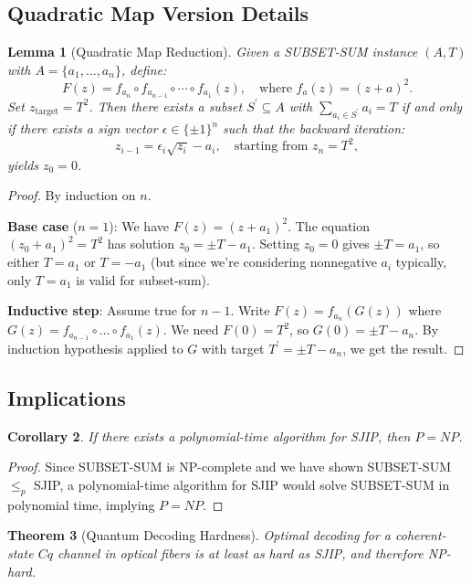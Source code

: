 \documentclass[12pt]{article}
\newtheorem{theorem}{Theorem}[section]
\newtheorem{lemma}[theorem]{Lemma}
\newtheorem{corollary}[theorem]{Corollary}
\begin{document}
\subsection{Quadratic Map Version Details}
\begin{lemma}[Quadratic Map Reduction]
Given a SUBSET-SUM instance $(A,T)$ with $A = \{a_{1},\ldots ,a_{n}\}$, define:
\[
F(z) = f_{a_{n}}\circ f_{a_{n - 1}}\circ \cdots \circ f_{a_{1}}(z),\quad \text{where } f_{a}(z) = (z + a)^{2}.
\]
Set $z_{\mathrm{target}} = T^{2}$. Then there exists a subset $S^{\prime}\subseteq A$ with $\sum_{a_{i}\in S^{\prime}}a_{i} = T$ if and only if there exists a sign vector $\epsilon \in \{\pm 1\}^{n}$ such that the backward iteration:
\[
z_{i - 1} = \epsilon_{i}\sqrt{z_{i}} -a_{i},\quad \text{starting from } z_{n} = T^{2},
\]
yields $z_{0} = 0$.
\end{lemma}

\begin{proof}
By induction on $n$.

\textbf{Base case} ($n = 1$): We have $F(z) = (z + a_{1})^{2}$. The equation $(z_{0} + a_{1})^{2} = T^{2}$ has solution $z_{0} = \pm T - a_{1}$. Setting $z_{0} = 0$ gives $\pm T = a_{1}$, so either $T = a_{1}$ or $T = -a_{1}$ (but since we're considering nonnegative $a_{i}$ typically, only $T = a_{1}$ is valid for subset-sum).

\textbf{Inductive step}: Assume true for $n - 1$. Write $F(z) = f_{a_{n}}(G(z))$ where $G(z) = f_{a_{n - 1}}\circ \dots \circ f_{a_{1}}(z)$. We need $F(0) = T^{2}$, so $G(0) = \pm T - a_{n}$. By induction hypothesis applied to $G$ with target $T^{\prime} = \pm T - a_{n}$, we get the result.
\end{proof}

\subsection{Implications}
\begin{corollary}
If there exists a polynomial-time algorithm for SJIP, then $P = NP$.
\end{corollary}

\begin{proof}
Since SUBSET-SUM is NP-complete and we have shown SUBSET-SUM $\leq_{p}$ SJIP, a polynomial-time algorithm for SJIP would solve SUBSET-SUM in polynomial time, implying $P = NP$.
\end{proof}

\begin{theorem}[Quantum Decoding Hardness]
Optimal decoding for a coherent-state $Cq$ channel in optical fibers is at least as hard as SJIP, and therefore NP-hard.
\end{theorem}
\end{document}
